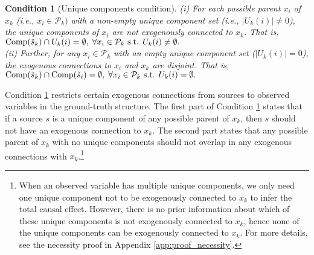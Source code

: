 \documentclass[12pt]{article}
\newtheorem{condition}{Condition}
\begin{document}
\vspace{-2mm}
\begin{condition}[Unique components condition]\label{condition:unique_component}
(i) For each possible parent $x_i$ of $x_k$ (i.e., $x_i \in \mathcal{P}_k)$ with a non-empty unique component set (i.e., $|U_{k}(i)|\neq 0$), the unique components of $x_i$ are not exogenously connected to $x_k$. That is, $ {\rm{Comp}}(\tilde{s}_k) \cap  U_k(i) =\emptyset,\; \forall x_i\in \mathcal{P}_k \text{ s.t. } U_k (i) \neq \emptyset.$\\ (ii) Further, for any $x_i\in \mathcal{P}_k$ with an empty unique component set ($|U_{k}(i)|= 0$), the exogenous connections to $x_i$ and $x_k$ are disjoint. That is,  ${\rm{Comp}}(\tilde{s}_k) \cap  {\rm{Comp}}(\tilde{s}_{i}) = \emptyset,\;  \forall x_i\in \mathcal{P}_k \text{ s.t. } U_k (i) = \emptyset.$
\end{condition}
\vspace{-2mm}
Condition \ref{condition:unique_component} restricts certain exogenous connections from sources to observed variables in the ground-truth structure. The first part of Condition \ref{condition:unique_component} states that if a source $s$ is a unique component of any possible parent of $x_k$, then $s$ should not have an exogenous connection to $x_k$. The second part states that any possible parent of $x_k$ with no unique components should not overlap in any exogenous connections with $x_k$.\footnote{When an observed variable has multiple unique components, we only need one unique component not to be exogenously connected to $x_k$ to infer the total causal effect. However, there is no prior information about which of these unique components is not exogenously connected to $x_k$, hence none of the unique components can be exogenously connected to $x_k$. For more details, see the necessity proof in Appendix \ref{app:proof_necessity}.}
\end{document}
